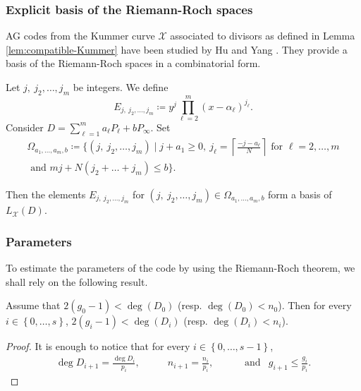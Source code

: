 \documentclass[a4paper,USenglish,autoref]{lipics-v2021}
\newcommand\ceil[1]{\left\lceil #1 \right\rceil}
\newcommand{\set}[1]{\left\{#1\right\}}
\newcommand{\range}[1]{\set{0,\dots,#1-1}}
\newcommand{\Range}[2]{\set{#1,\dots,#2}}
\newcommand\calX{\mathcal{X}}
\newcommand\mydef{\coloneqq}
\begin{document}
\subsubsection{Explicit basis of the Riemann-Roch spaces}

AG codes from the Kummer curve $\calX$ associated to divisors as defined in Lemma \ref{lem:compatible-Kummer} have been studied by Hu and Yang \cite{HY18}. They provide a basis of the Riemann-Roch spaces in a combinatorial form.

\begin{theorem}[{\cite[Theorem~5]{HY18}}]
	Let $j, \: j_2, \dots, j_m$ be integers. We define
	\[E_{j, \: j_2, \dots, j_m}\mydef y^j \prod_{\ell=2}^m (x-\alpha_\ell)^{j_\ell}.\]
	Consider $D=\sum_{\ell =1}^m a_\ell P_\ell + bP_\infty$. Set
	\begin{align*}\Omega_{a_1,\dots,a_m,b}\mydef \biggl\{ (j, \: j_2, \dots, j_m) \mid j+a_1 \geq 0, \: j_\ell =\ceil{\frac{-j-a_\ell}{N}} \text{ for } \ell = 2,\dots,m   \\
		\text{ and }mj+N(j_2+\dots+j_m) \leq b \biggr\}.\end{align*}
	
	Then the elements $E_{j, \: j_2, \dots, j_m}$ for $(j, \: j_2, \dots, j_m) \in \Omega_{a_1,\dots,a_m,b}$ form a basis of $L_\calX(D)$.
\end{theorem}



\subsubsection{Parameters}

To estimate the parameters of the code by using the Riemann-Roch theorem, we shall rely on the following result. 

\begin{lemma}\label{lem:nice_deg}
	Assume that $2(g_0-1) < \deg(D_0)$  (resp. $\deg(D_0)< n_0$). Then for every $i \in \Range{0}{s}$, $2(g_i-1) < \deg(D_i)$ (resp. $\deg(D_i) < n_i$).
	
\end{lemma}

\begin{proof}
	It is enough to notice that for every $i \in \range{s}$, 
	\[ \begin{aligned}
		&\deg D_{i+1} = \frac{\deg{D_i}}{p_i},\qquad  & n_{i+1} = \frac{n_i}{p_i}, \qquad & \text{ and} & g_{i+1} \leq \frac{g_i}{p_i}.&
	\end{aligned}\]
\end{proof}
\end{document}

